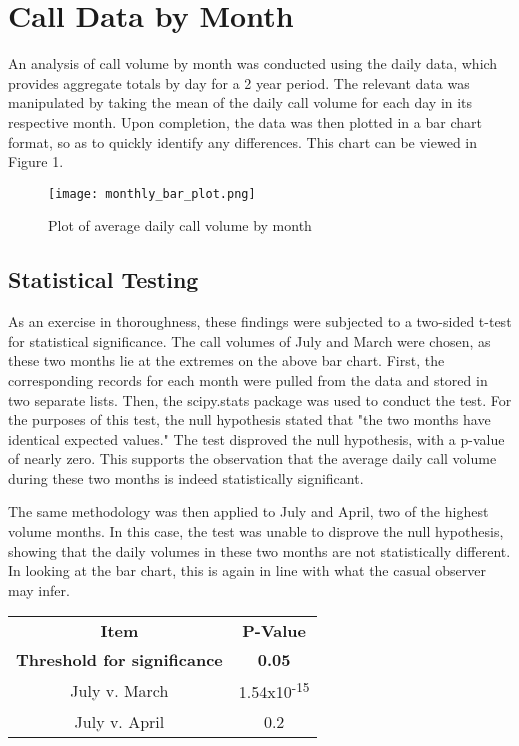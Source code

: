 \documentclass[11pt,twocolumn]{article}
\begin{document}
\section{Call Data by Month}
An analysis of call volume by month was conducted using the daily data, which provides aggregate totals by day for a 2 year period. The relevant data was manipulated by taking the mean of the daily call volume for each day in its respective month.  Upon completion, the data was then plotted in a bar chart format, so as to quickly identify any differences.  This chart can be viewed in Figure 1.

\begin{figure}[h]
  \texttt{[image: monthly\_bar\_plot.png]}
  \caption{Plot of average daily call volume by month}
\end{figure}

\subsection{Statistical Testing}
As an exercise in thoroughness, these findings were subjected to a two-sided t-test for statistical significance.  The call volumes of July and March were chosen, as these two months lie at the extremes on the above bar chart.  First, the corresponding records for each month were pulled from the data and stored in two separate lists.  Then, the scipy.stats package was used to conduct the test.  For the purposes of this test, the null hypothesis stated that "the two months have identical expected values."  The test disproved the null hypothesis, with a p-value of nearly zero.  
This supports the observation that the average daily call volume during these two months is indeed statistically significant.
\par
The same methodology was then applied to July and April, two of the highest volume months.  In this case, the test was unable to disprove the null hypothesis, showing that the daily volumes in these two months are not statistically different.  In looking at the bar chart, this is again in line with what the casual observer may infer.
\begin{center}
\begin{tabular}{ |c|c| }
\hline 
 \textbf{Item} & \textbf{P-Value} \\
 \textbf{Threshold for significance} & \textbf{0.05} \\
 July v. March & 1.54x10\textsuperscript{-15} \\ 
 July v. April & 0.2 \\ 
 \hline
\end{tabular}
\end{center}
\end{document}
